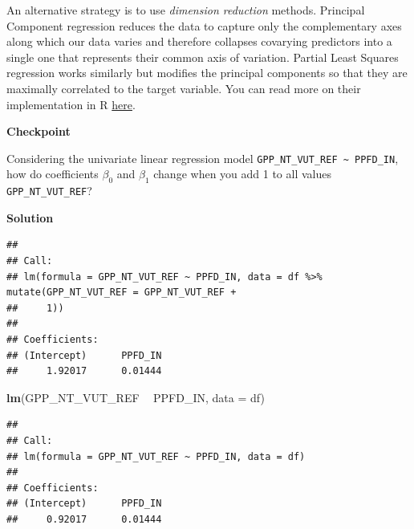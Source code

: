\documentclass[
]{book}
\newenvironment{Shaded}{\begin{snugshade}}{\end{snugshade}}
\newcommand{\DataTypeTok}[1]{\textcolor[rgb]{0.13,0.29,0.53}{#1}}
\newcommand{\DecValTok}[1]{\textcolor[rgb]{0.00,0.00,0.81}{#1}}
\newcommand{\KeywordTok}[1]{\textcolor[rgb]{0.13,0.29,0.53}{\textbf{#1}}}
\newcommand{\NormalTok}[1]{#1}
\newcommand{\OperatorTok}[1]{\textcolor[rgb]{0.81,0.36,0.00}{\textbf{#1}}}
\newcommand{\StringTok}[1]{\textcolor[rgb]{0.31,0.60,0.02}{#1}}
\begin{document}
An alternative strategy is to use \emph{dimension reduction} methods. Principal Component regression reduces the data to capture only the complementary axes along which our data varies and therefore collapses covarying predictors into a single one that represents their common axis of variation. Partial Least Squares regression works similarly but modifies the principal components so that they are maximally correlated to the target variable. You can read more on their implementation in R \href{https://bradleyboehmke.github.io/HOML/linear-regression.html\#PCR}{here}.

\textbf{Checkpoint}

Considering the univariate linear regression model \texttt{GPP\_NT\_VUT\_REF\ \textasciitilde{}\ PPFD\_IN}, how do coefficients \(\beta_0\) and \(\beta_1\) change when you add 1 to all values \texttt{GPP\_NT\_VUT\_REF}?

\textbf{Solution}

\begin{Shaded}
\end{Shaded}

\begin{verbatim}
## 
## Call:
## lm(formula = GPP_NT_VUT_REF ~ PPFD_IN, data = df %>% mutate(GPP_NT_VUT_REF = GPP_NT_VUT_REF + 
##     1))
## 
## Coefficients:
## (Intercept)      PPFD_IN  
##     1.92017      0.01444
\end{verbatim}

\begin{Shaded}
\begin{Highlighting}[]
\KeywordTok{lm}\NormalTok{(GPP_NT_VUT_REF }\OperatorTok{~}\StringTok{ }\NormalTok{PPFD_IN, }\DataTypeTok{data =}\NormalTok{ df)}
\end{Highlighting}
\end{Shaded}

\begin{verbatim}
## 
## Call:
## lm(formula = GPP_NT_VUT_REF ~ PPFD_IN, data = df)
## 
## Coefficients:
## (Intercept)      PPFD_IN  
##     0.92017      0.01444
\end{verbatim}
\end{document}
